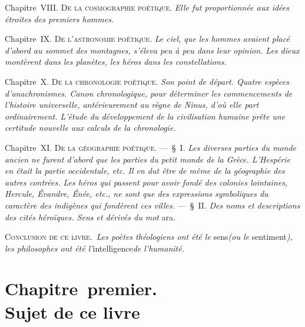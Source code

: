 \documentclass[french,twoside]{book} %
\newcommand\chapteropen{} %
\newcommand\chaptercont{} %
\newcommand\chapterclose{} %
\begin{document}
Chapitre {\scshape VIII. De la cosmographie poétique.} {\itshape Elle fut proportionnée aux idées étroites des premiers hommes.}\par
Chapitre {\scshape IX. De l’astronomie poétique.} {\itshape Le ciel, que les hommes avaient placé d’abord au sommet des montagnes, s’éleva peu à peu dans leur opinion. Les dieux montèrent dans les planètes, les héros dans les constellations.}\par
 Chapitre {\scshape X. De la chronologie poétique.} {\itshape Son point de départ. Quatre espèces d’anachronismes. Canon chronologique, pour déterminer les commencements de l’histoire universelle, antérieurement au règne de Ninus, d’où elle part ordinairement. L’étude du développement de la civilisation humaine prête une certitude nouvelle aux calculs de la chronologie.}\par
Chapitre {\scshape XI. De la géographie poétique.} — § I. {\itshape Les diverses parties du monde ancien ne furent d’abord que les parties du petit monde de la Grèce. L’Hespérie en était la partie occidentale, etc. Il en dut être de même de la géographie des autres contrées. Les héros qui passent pour avoir fondé des colonies lointaines, Hercule, Évandre, Énée, etc., ne sont que des expressions symboliques du caractère des indigènes qui fondèrent ces villes.} — § II. {\itshape Des noms et descriptions des cités héroïques. Sens et dérivés du mot} ara.\par
{\scshape Conclusion de ce livre.} {\itshape Les poètes théologiens ont été le} sens{\itshape  (ou le} sentiment{\itshape ), les philosophes ont été l’}intelligence{\itshape  de l’humanité.}
\chapterclose


\chapteropen
\chapter[{Chapitre premier. Sujet de ce livre}]{Chapitre premier. \\
Sujet de ce livre}

\chaptercont
\end{document}
